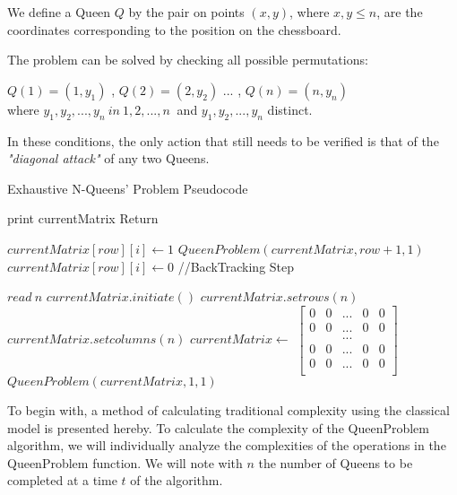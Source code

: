We define a Queen $Q$ by the pair on points $ (x, y) $, where $ x, y \leq n $, are the coordinates corresponding to the position on the chessboard.

The problem can be solved by checking all possible permutations:

$ Q (1) = (1, y_1) $ , $ Q (2) = (2, y_2) $ ... , $ Q (n) = (n, y_n) $ \\
where $ y_1, y_2, ..., y_n \ in \ { 1,2, ..., n \ } $ and $ y_1, y_2, ..., y_n $ distinct.

In these conditions, the only action that still needs to be verified is that of the \textit{"diagonal attack"} of any two Queens.

\begin{algorithm}[H]
    \caption{Exhaustive N-Queens’ Problem Pseudocode}
    \begin{algorithmic}[1]
        \State print currentMatrix
        \State Return

        \EndIf
        \State $currentMatrix[row][i] \gets 1$
        \State $QueenProblem(currentMatrix,row+1,1)$
        \State $currentMatrix[row][i] \gets 0$
        //BackTracking Step
        \EndIf
        \EndFor
        \EndProcedure


        \State $read\ n$
        \State $currentMatrix.initiate()$
        \State $currentMatrix.setrows(n)$
        \State $currentMatrix.setcolumns(n)$
        \State $currentMatrix \gets$
        $\left[\begin{array}{ccccc}
                   0 & 0 & ... & 0 & 0    \\
                   0 & 0 & ... & 0 & 0    \\
                   & & ... & &    \\
                   0 & 0 & ... & 0 & 0    \\
                   0 & 0 & ... & 0 & 0    \\
        \end{array}\right]$
        \State $QueenProblem(currentMatrix,1,1)$
        \EndProcedure
    \end{algorithmic}
\end{algorithm}

To begin with, a method of calculating traditional complexity using the classical model is presented hereby.
To calculate the complexity of the QueenProblem algorithm, we will individually analyze the complexities of the operations in the QueenProblem function. We will note with $n$ the number of Queens to be completed at a time $ t $ of the algorithm.

